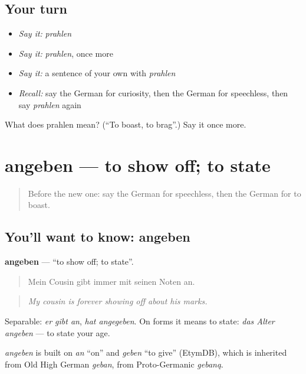 \subsection*{Your turn}
\begin{itemize}
\raggedright
  \item \emph{Say it:} \emph{prahlen}
  \item \emph{Say it:} \emph{prahlen}, once more
  \item \emph{Say it:} a sentence of your own with \emph{prahlen}
  \item \emph{Recall:} say the German for curiosity, then the German for speechless, then say \emph{prahlen} again
\end{itemize}

\begin{tcolorbox}[breakable,colback=teal!4,colframe=teal!35!black,title={Before you move on}]
What does prahlen mean? (\textquotedblleft{}To boast, to brag\textquotedblright{}.) Say it once more.
\end{tcolorbox}
\section[angeben]{angeben — to show off; to state}

\label{lesson:GE-C475-angeben}



\begin{quote}
Before the new one: say the German for speechless, then the German for to boast.
\end{quote}

\subsection*{You'll want to know: angeben}
\textbf{angeben} — \textquotedblleft{}to show off; to state\textquotedblright{}.

\begin{quote}
Mein Cousin gibt immer mit seinen Noten an.
\end{quote}

\begin{quote}
\emph{My cousin is forever showing off about his marks.}
\end{quote}

Separable: \emph{er gibt an}, \emph{hat angegeben}. On forms it means to state: \emph{das Alter angeben} — to state your age.

\begin{cousinweb}
\emph{angeben} is built on \emph{an} \textquotedblleft{}on\textquotedblright{} and \emph{geben} \textquotedblleft{}to give\textquotedblright{} (EtymDB), which is inherited from Old High German \emph{geban}, from Proto-Germanic \emph{gebaną}.
\end{cousinweb}

